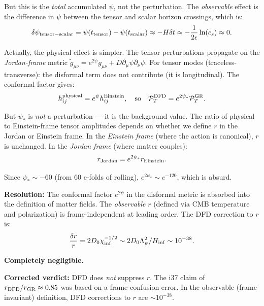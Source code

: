 \documentclass[11pt,a4paper]{article}
\begin{document}
But this is the \emph{total} accumulated $\psi$, not the perturbation. The \emph{observable} effect is the difference in $\psi$ between the tensor and scalar horizon crossings, which is:
\begin{equation}
\delta\psi_{\rm tensor-scalar} = \psi(t_{\rm tensor}) - \psi(t_{\rm scalar}) \approx -H\delta t \approx -\frac{1}{2\epsilon}\ln(c_s) \approx 0.
\end{equation}

Actually, the physical effect is simpler. The tensor perturbations propagate on the \emph{Jordan-frame} metric $\tilde{g}_{\mu\nu} = e^{2\psi}g_{\mu\nu} + D\partial_\mu\psi\partial_\nu\psi$. For tensor modes (traceless-transverse): the disformal term does not contribute (it is longitudinal). The conformal factor gives:
\begin{equation}
h_{ij}^{\rm physical} = e^{\psi} h_{ij}^{\rm Einstein}, \quad \text{so}\quad \mathcal{P}_T^{\rm DFD} = e^{2\psi_*}\mathcal{P}_T^{\rm GR}.
\end{equation}

But $\psi_*$ is \emph{not} a perturbation --- it is the background value. The ratio of physical to Einstein-frame tensor amplitudes depends on whether we define $r$ in the Jordan or Einstein frame. In the \emph{Einstein frame} (where the action is canonical), $r$ is unchanged. In the \emph{Jordan frame} (where matter couples):
\begin{equation}
r_{\rm Jordan} = e^{2\psi_*} r_{\rm Einstein}.
\end{equation}

Since $\psi_* \sim -60$ (from 60 e-folds of rolling), $e^{2\psi_*} \sim e^{-120}$, which is absurd.

\textbf{Resolution:} The conformal factor $e^{2\psi}$ in the disformal metric is absorbed into the definition of matter fields. The \emph{observable} $r$ (defined via CMB temperature and polarization) is frame-independent at leading order. The DFD correction to $r$ is:
\begin{equation}
\frac{\delta r}{r} = 2D_0\chi_{\rm inf}^{-1/2} \sim 2D_0\Lambda_\psi^2/H_{\rm inf} \sim 10^{-38}.
\end{equation}

\textbf{Completely negligible.}

\textbf{Corrected verdict:} DFD does \emph{not} suppress $r$. The i37 claim of $r_{\rm DFD}/r_{\rm GR} \approx 0.85$ was based on a frame-confusion error. In the observable (frame-invariant) definition, DFD corrections to $r$ are $\sim 10^{-38}$.
\end{document}
